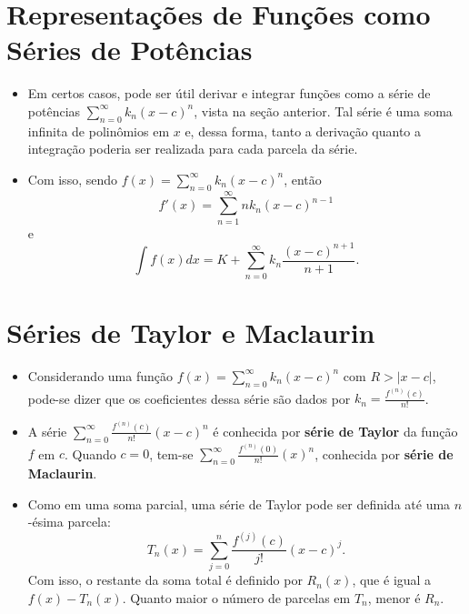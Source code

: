 	\section{Representações de Funções como Séries de Potências}
		\begin{itemize}
			
		\item Em certos casos, pode ser útil derivar e integrar funções como a série de potências $\sum_{n=0}^{\infty} k_{n}(x - c)^{n}$, vista na seção anterior. Tal série é uma soma infinita de polinômios em $x$ e, dessa forma, tanto a derivação quanto a integração poderia ser realizada para cada parcela da série.
		
		\item Com isso, sendo $f(x) = \sum_{n=0}^{\infty} k_{n}(x - c)^{n}$, então
			\begin{equation}
				f'(x) = \sum_{n = 1}^{\infty} nk_{n}(x - c)^{n - 1}
			\end{equation} e
			\begin{equation}
				\int f(x) dx = K + \sum_{n = 0}^{\infty} k_{n} \frac{(x - c)^{n + 1}}{n + 1}.
			\end{equation}
			
		\end{itemize}
	
	\section{Séries de Taylor e Maclaurin}
	    \label{TayMacSec}
	
		\begin{itemize}
			
			\item Considerando uma função $f(x) = \sum_{n=0}^{\infty} k_{n}(x - c)^{n}$ com $R > |x- c|$, pode-se dizer que os coeficientes dessa série são dados por $k_{n} = \frac{f^{(n)}(c)}{n!}$.
			
			\item A série $\sum_{n=0}^{\infty} \frac{f^{(n)}(c)}{n!}(x - c)^{n}$ é conhecida por \textbf{série de Taylor} da função $f$ em $c$. Quando $c = 0$, tem-se $\sum_{n=0}^{\infty} \frac{f^{(n)}(0)}{n!}(x)^{n}$, conhecida por \textbf{série de Maclaurin}.
			
			\item Como em uma soma parcial, uma série de Taylor pode ser definida até uma $n$-ésima parcela:
				\begin{equation}
				\label{TayPol}
					T_{n}(x) = \sum_{j=0}^{n} \frac{f^{(j)}(c)}{j!}(x - c)^{j}.
				\end{equation}
			Com isso, o restante da soma total é definido por $R_{n}(x)$, que é igual a $f(x) - T_{n}(x)$. Quanto maior o número de parcelas em $T_{n}$, menor é $R_{n}$.
			
		\end{itemize}